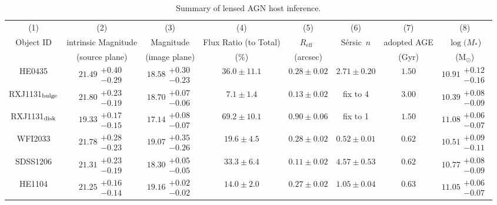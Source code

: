 \documentclass[fleqn,usenatbib]{mnras}
\newcommand{\sersic}{S\'ersic}
\newcommand{\reff}{{$R_{\mathrm{eff}}$}}
\begin{document}
\begin{table}
\renewcommand{\arraystretch}{1.25}
\centering
  \begin{threeparttable}
\caption{Summary of lensed AGN host inference.}\label{tab:host_measure}    
     \begin{tabular}{cccccccc}
\hline     
(1) & (2) & (3) & (4) & (5) & (6) & (7) & (8) \\    
Object ID & intrinsic Magnitude & Magnitude & Flux Ratio (to Total) & \reff\ & \sersic\ $n$ & adopted AGE & $\log (M_{*}$)  \\
 & (source plane) & (image plane) & ($\%$) & (arcsec) & & (Gyr) & (M$_{\odot}$) \\ \hline
HE0435 & $21.49\substack{+0.40\\-0.29}$ & $18.58\substack{+0.30\\-0.23}$ & $36.0\pm11.1$ & $0.28\pm0.02$ & $2.71\pm0.20$ & $1.50$ & $10.91\substack{+0.12\\-0.16}$ \\
RXJ1131$_{\rm bulge}$ & $21.80\substack{+0.23\\-0.19}$ & $18.70\substack{+0.07\\-0.06}$ & $7.1\pm1.4$ & $0.13\pm0.02$ & fix to 4 & $3.00$ & $10.39\substack{+0.08\\-0.09}$ \\
RXJ1131$_{\rm disk}$ & $19.33\substack{+0.17\\-0.15}$ & $17.14\substack{+0.08\\-0.07}$ & $69.2\pm10.1$ & $0.90\pm0.06$ & fix to 1 & $1.50$ & $11.08\substack{+0.06\\-0.07}$ \\
WFI2033 & $21.78\substack{+0.28\\-0.23}$ & $19.07\substack{+0.35\\-0.26}$ & $19.6\pm4.5$ & $0.28\pm0.02$ & $0.52\pm0.01$ & $0.62$ & $10.51\substack{+0.09\\-0.11}$ \\
SDSS1206 & $21.31\substack{+0.23\\-0.19}$ & $18.30\substack{+0.05\\-0.05}$ & $33.3\pm6.4$ & $0.11\pm0.02$ & $4.57\pm0.53$ & $0.62$ & $10.77\substack{+0.08\\-0.09}$ \\
HE1104 & $21.25\substack{+0.16\\-0.14}$ & $19.16\substack{+0.02\\-0.02}$ & $14.0\pm2.0$ & $0.27\pm0.02$ & $1.05\pm0.04$ & $0.63$ & $11.05\substack{+0.06\\-0.07}$ \\

\end{tabular}
\end{threeparttable}
\end{table}
\end{document}
